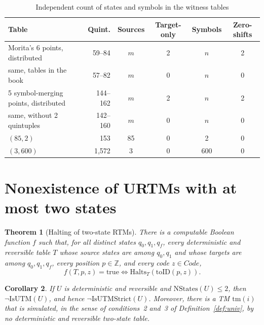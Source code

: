 \documentclass{article}
\newtheorem{theorem}{Theorem}
\newtheorem{corollary}[theorem]{Corollary}
\theoremstyle{definition}
\theoremstyle{remark}
\newcommand{\Code}{\mathit{Code}}
\begin{document}
\begin{table}[tb]
\centering
\caption{Independent count of states and symbols in the witness tables}
\label{tab:counts}
\small
\begin{tabular}{lrcccc}
\toprule
Table & Quint. & Sources & Target-only & Symbols & Zero-shifts \\
\midrule
Morita's 6 points, distributed & 59--84 & $m$ & 2 & $n$ & 2 \\
same, tables in the book & 57--82 & $m$ & 0 & $n$ & 0 \\
5 symbol-merging points, distributed & 144--162 & $m$ & 2 & $n$ & 2 \\
same, without 2 quintuples & 142--160 & $m$ & 0 & $n$ & 0 \\
$(85,2)$ & 153 & 85 & 0 & 2 & 0 \\
$(3,600)$ & 1,572 & 3 & 0 & 600 & 0 \\
\bottomrule
\end{tabular}
\end{table}

\section{Nonexistence of URTMs with at most two states}
\label{sec:twostate}

\begin{theorem}[Halting of two-state RTMs]
\label{thm:halting}
There is a computable Boolean function $f$ such that, for all distinct states $q_0,q_1,q_f$, every deterministic and reversible table $T$ whose source states are among $q_0,q_1$ and whose targets are among $q_0,q_1,q_f$, every position $p\in\mathbb{Z}$, and every code $z\in\Code$,
\[
  f(T,p,z)=\mathrm{true}\iff\mathrm{Halts}_T(\mathrm{toID}(p,z)).
\]
\end{theorem}

\begin{corollary}
\label{cor:twostate}
If $U$ is deterministic and reversible and $\mathrm{NStates}(U)\le 2$, then $\neg\mathrm{IsUTM}(U)$, and hence $\neg\mathrm{IsUTMStrict}(U)$.
Moreover, there is a TM $\mathrm{tm}(i)$ that is simulated, in the sense of conditions~2 and~3 of Definition~\ref{def:univ}, by no deterministic and reversible two-state table.
\end{corollary}
\end{document}

